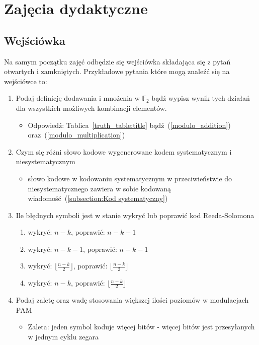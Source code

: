 \section{Zajęcia dydaktyczne}
\subsection{Wejściówka}

Na samym początku zajęć odbędzie się wejściówka składająca się z pytań otwartych
i zamkniętych.
Przykładowe pytania które mogą znaleźć się na wejściówce to:

\begin{enumerate}
    \item Podaj definicję dodawania i mnożenia w $\mathbb{F}_2$ bądź wypisz wynik tych
    działań dla wszystkich możliwych kombinacji elementów.
    \begin{itemize}
        \item Odpowiedź: Tablica~\ref{truth_table:title} bądź~(\ref{modulo_addition})
        oraz~(\ref{modulo_multiplication})
    \end{itemize}
    \item Czym się różni słowo kodowe wygenerowane kodem systematycznym i niesystematycznym
    \begin{itemize}
        \item słowo kodowe w kodowaniu systematycznym w przeciwieństwie do niesystematycznego zawiera w sobie kodowaną wiadomość~(\ref{subsection:Kod systematyczny})
    \end{itemize}
    \item Ile błędnych symboli jest w stanie wykryć lub poprawić kod Reeda-Solomona
    \begin{enumerate}[label=\Alph*:]
        \item wykryć: $n-k$, poprawić: $n-k-1$
        \item wykryć: $n-k-1$, poprawić: $n-k-1$
        \item wykryć: $\lfloor \frac{n-k}{2} \rfloor$, poprawić: $\lfloor \frac{n-k}{2} \rfloor$
        \item wykryć: $n-k$, poprawić: $\lfloor \frac{n-k}{2} \rfloor$
    \end{enumerate}
    \item Podaj zaletę oraz wadę stosowania większej ilości poziomów w modulacjach PAM
    \begin{itemize}
        \item Zaleta: jeden symbol koduje więcej bitów - więcej bitów jest przesyłanych w jednym cyklu zegara

\end{itemize}
\end{enumerate}

